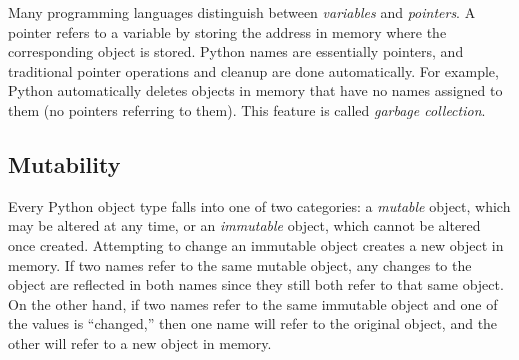 \begin{info}
Many programming languages distinguish between \emph{variables} and \emph{pointers}.
A pointer refers to a variable by storing the address in memory where the corresponding object is stored.
Python names are essentially pointers, and traditional pointer operations and cleanup are done automatically.
For example, Python automatically deletes objects in memory that have no names assigned to them (no pointers referring to them).
This feature is called \emph{garbage collection}.
\end{info}

\subsection*{Mutability} %

Every Python object type falls into one of two categories: a \emph{mutable} object, which may be altered at any time, or an \emph{immutable} object, which cannot be altered once created.
Attempting to change an immutable object creates a new object in memory.
If two names refer to the same mutable object, any changes to the object are reflected in both names since they still both refer to that same object.
On the other hand, if two names refer to the same immutable object and one of the values is ``changed,'' then one name will refer to the original object, and the other will refer to a new object in memory.

